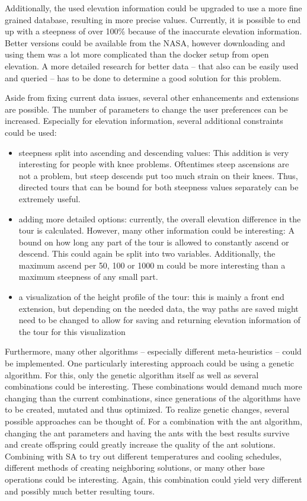 Additionally, the used elevation information could be upgraded to use a more fine grained database, resulting in more precise values. 
Currently, it is possible to end up with a steepness of over 100\% because of the inaccurate elevation information.
Better versions could be available from the NASA, however downloading and using them was a lot more complicated than the docker setup from open elevation.
A more detailed research for better data -- that also can be easily used and queried -- has to be done to determine a good solution for this problem.

Aside from fixing current data issues, several other enhancements and extensions are possible.
The number of parameters to change the user preferences can be increased. 
Especially for elevation information, several additional constraints could be used:
\begin{itemize}
	\item steepness split into ascending and descending values: This addition is very interesting for people with knee problems. Oftentimes steep ascensions are not a problem, but steep descends put too much strain on their knees. Thus, directed tours that can be bound for both steepness values separately can be extremely useful.
	\item adding more detailed options: currently, the overall elevation difference in the tour is calculated. However, many other information could be interesting:
	 A bound on how long any part of the tour is allowed to constantly ascend or descend. This could again be split into two variables.
	Additionally, the maximum ascend per 50, 100 or 1000 m could be more interesting than a maximum steepness of any small part.
	\item a visualization of the height profile of the tour: this is mainly a front end extension, but depending on the needed data, the way paths are saved might need to be changed to allow for saving and returning elevation information of the tour for this visualization
\end{itemize}

Furthermore, many other algorithms -- especially different meta-heuristics -- could be implemented. 
One particularly interesting approach could be using a genetic algorithm.
For this, only the genetic algorithm itself as well as several combinations could be interesting. 
These combinations would demand much more changing than the current combinations, since generations of the algorithms have to be created, mutated and thus optimized. 
To realize genetic changes, several possible approaches can be thought of. 
For a combination with the ant algorithm, changing the ant parameters and having the ants with the best results survive and create offspring could greatly increase the quality of the ant solutions.
Combining with SA to try out different temperatures and cooling schedules, different methods of creating neighboring solutions, or many other base operations could be interesting.
Again, this combination could yield very different and possibly much better resulting tours.

